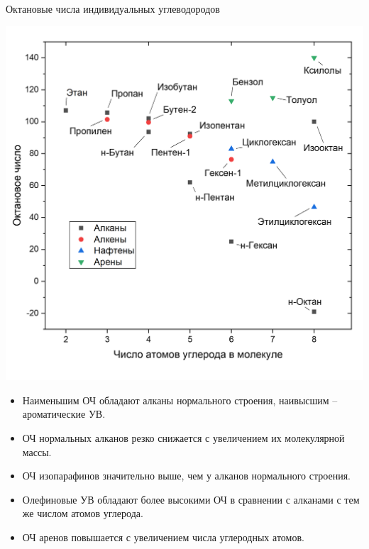 \documentclass[aspectratio=169, mathserif]{beamer}%
\begin{document}
\begin{frame}[fragile, label=c]{Октановые числа индивидуальных углеводородов}
\scriptsize
\begin{minipage}{.55\textwidth}
\includegraphics[width=\linewidth]{./pics/ron}
\end{minipage}
\begin{minipage}{.44\textwidth}
\begin{itemize}
\item Наименьшим ОЧ обладают алканы нормального строения, наивысшим – ароматические УВ.
\item ОЧ нормальных алканов резко снижается с увеличением их молекулярной массы.
\item ОЧ изопарафинов значительно выше, чем у алканов нормального строения.
\item Олефиновые УВ обладают более высокими ОЧ в сравнении с алканами с тем же числом атомов углерода.
\item ОЧ аренов повышается с увеличением числа углеродных атомов.
\end{itemize}
\end{minipage}
\vfill
\end{frame}
\end{document}
